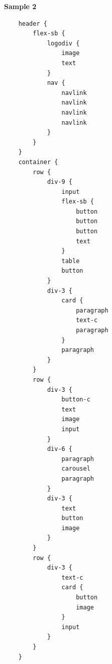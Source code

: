 \documentclass{ioereport}
\begin{document}
    
\textbf{Sample 2}
\begin{verbatim}
    header {
        flex-sb {
            logodiv {
                image
                text
            }
            nav {
                navlink
                navlink
                navlink
                navlink
            }
        }
    }
    container {
        row {
            div-9 {
                input
                flex-sb {
                    button
                    button
                    button
                    text
                }
                table
                button
            }
            div-3 {
                card {
                    paragraph
                    text-c
                    paragraph
                }
                paragraph
            }
        }
        row {
            div-3 {
                button-c
                text
                image
                input
            }
            div-6 {
                paragraph
                carousel
                paragraph
            }
            div-3 {
                text
                button
                image
            }
        }
        row {
            div-3 {
                text-c
                card {
                    button
                    image
                }
                input
            }
        }
    }
    \end{verbatim}    
\end{document}
